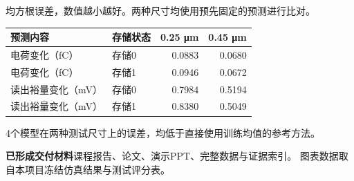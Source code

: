 \documentclass[UTF8,fontset=fandol,10pt,a4paper]{ctexart}
\newcommand{\sect}[1]{\par\vspace{9pt}{\large\bfseries #1}\par\vspace{4pt}}
\newcommand{\note}[1]{{\footnotesize\color{muted}#1}\par}
\begin{document}
\sect{新尺寸上的预测误差}
\note{均方根误差，数值越小越好。两种尺寸均使用预先固定的预测进行比对。}
\renewcommand{\arraystretch}{1.4}
\begin{tabularx}{\textwidth}{@{}Xlrr@{}}
\toprule
预测内容 & 存储状态 & 0.25 μm & 0.45 μm \\
\midrule
电荷变化（fC） & 存储0 & 0.0883 & 0.0680 \\
电荷变化（fC） & 存储1 & 0.0946 & 0.0672 \\
读出裕量变化（mV） & 存储0 & 0.7984 & 0.5194 \\
读出裕量变化（mV） & 存储1 & 0.8380 & 0.5049 \\
\bottomrule
\end{tabularx}
\vspace{9pt}
4个模型在两种测试尺寸上的误差，均低于直接使用训练均值的参考方法。

\vfill
\textbf{已形成交付材料}\quad 课程报告、论文、演示PPT、完整数据与证据索引。
\note{图表数据取自本项目冻结仿真结果与测试评分表。}
\end{document}
